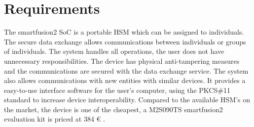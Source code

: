 

\section{Requirements}\label{chap:evaluation:requirements}

The smartfusion2 SoC is a portable HSM which can be assigned to individuals.
The secure data exchange allows communications between individuals or groups of individuals.
The system handles all operations, the user does not have unnecessary responsibilities.
The device has physical anti-tampering measures and the communications are secured with the data exchange service.
The system also allows communications with new entities with similar devices.
It provides a easy-to-use interface software for the user's computer, using the PKCS\#11 standard to increase device interoperability.
Compared to the available HSM's on the market, the device is one of the cheapest, a M2S090TS smartfusion2 evaluation kit is priced at 384 € \cite{smartfusionPrice}.


